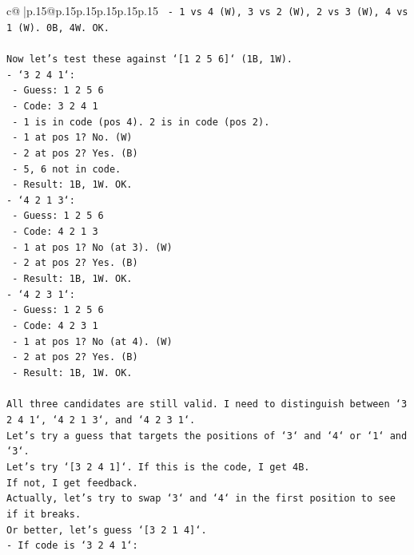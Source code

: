 \documentclass{article}
\begin{document}
{\begin{supertabular}{c@{$\;$}|p{.15\linewidth}@{}p{.15\linewidth}p{.15\linewidth}p{.15\linewidth}p{.15\linewidth}p{.15\linewidth}}
{{{\texttt{  {-} 1 vs 4 (W), 3 vs 2 (W), 2 vs 3 (W), 4 vs 1 (W). 0B, 4W. OK.} \\
\\ 
\texttt{Now let's test these against `{[}1 2 5 6{]}` (1B, 1W).} \\
\texttt{{-} `3 2 4 1`:} \\
\texttt{  {-} Guess: 1 2 5 6} \\
\texttt{  {-} Code: 3 2 4 1} \\
\texttt{  {-} 1 is in code (pos 4). 2 is in code (pos 2).} \\
\texttt{  {-} 1 at pos 1? No. (W)} \\
\texttt{  {-} 2 at pos 2? Yes. (B)} \\
\texttt{  {-} 5, 6 not in code.} \\
\texttt{  {-} Result: 1B, 1W. OK.} \\
\texttt{{-} `4 2 1 3`:} \\
\texttt{  {-} Guess: 1 2 5 6} \\
\texttt{  {-} Code: 4 2 1 3} \\
\texttt{  {-} 1 at pos 1? No (at 3). (W)} \\
\texttt{  {-} 2 at pos 2? Yes. (B)} \\
\texttt{  {-} Result: 1B, 1W. OK.} \\
\texttt{{-} `4 2 3 1`:} \\
\texttt{  {-} Guess: 1 2 5 6} \\
\texttt{  {-} Code: 4 2 3 1} \\
\texttt{  {-} 1 at pos 1? No (at 4). (W)} \\
\texttt{  {-} 2 at pos 2? Yes. (B)} \\
\texttt{  {-} Result: 1B, 1W. OK.} \\
\\ 
\texttt{All three candidates are still valid. I need to distinguish between `3 2 4 1`, `4 2 1 3`, and `4 2 3 1`.} \\
\texttt{Let's try a guess that targets the positions of `3` and `4` or `1` and `3`.} \\
\texttt{Let's try `{[}3 2 4 1{]}`. If this is the code, I get 4B.} \\
\texttt{If not, I get feedback.} \\
\texttt{Actually, let's try to swap `3` and `4` in the first position to see if it breaks.} \\
\texttt{Or better, let's guess `{[}3 2 1 4{]}`.} \\
\texttt{{-} If code is `3 2 4 1`:} \\
}}}
\end{supertabular}}
\end{document}
